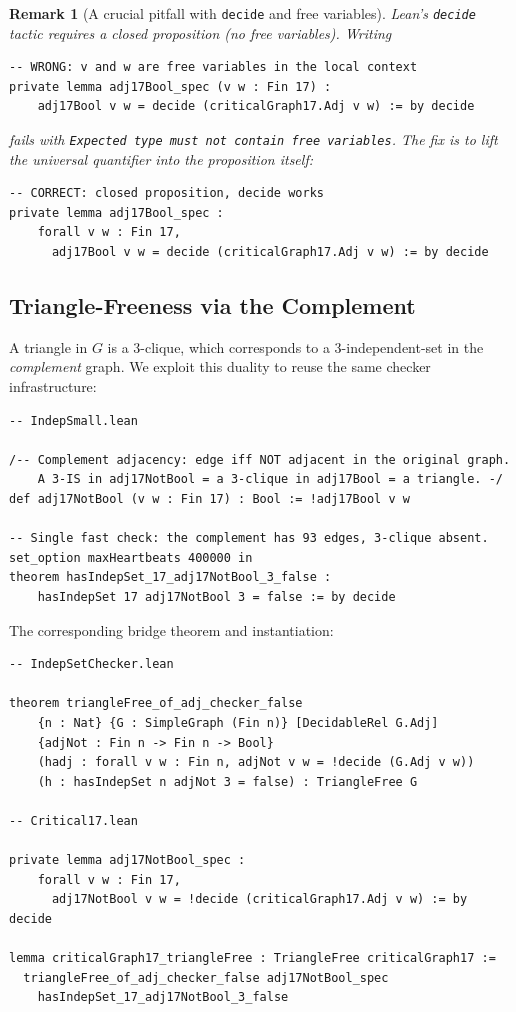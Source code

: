 \documentclass[11pt]{article}
\newtheorem{remark}[theorem]{Remark}
\newcommand{\lean}[1]{\texttt{#1}}
\begin{document}
\begin{remark}[A crucial pitfall with \lean{decide} and free variables]
\label{rem:freevar}
Lean's \lean{decide} tactic requires a \emph{closed} proposition (no free variables).
Writing

\begin{lstlisting}
-- WRONG: v and w are free variables in the local context
private lemma adj17Bool_spec (v w : Fin 17) :
    adj17Bool v w = decide (criticalGraph17.Adj v w) := by decide
\end{lstlisting}

\noindent
fails with \texttt{Expected type must not contain free variables}.
The fix is to lift the universal quantifier into the proposition itself:

\begin{lstlisting}
-- CORRECT: closed proposition, decide works
private lemma adj17Bool_spec :
    forall v w : Fin 17,
      adj17Bool v w = decide (criticalGraph17.Adj v w) := by decide
\end{lstlisting}
\end{remark}

\subsection{Triangle-Freeness via the Complement}
\label{sec:checker:tf}

A triangle in $G$ is a 3-clique, which corresponds to a 3-independent-set
in the \emph{complement} graph.
We exploit this duality to reuse the same checker infrastructure:

\begin{lstlisting}
-- IndepSmall.lean

/-- Complement adjacency: edge iff NOT adjacent in the original graph.
    A 3-IS in adj17NotBool = a 3-clique in adj17Bool = a triangle. -/
def adj17NotBool (v w : Fin 17) : Bool := !adj17Bool v w

-- Single fast check: the complement has 93 edges, 3-clique absent.
set_option maxHeartbeats 400000 in
theorem hasIndepSet_17_adj17NotBool_3_false :
    hasIndepSet 17 adj17NotBool 3 = false := by decide
\end{lstlisting}

\noindent
The corresponding bridge theorem and instantiation:

\begin{lstlisting}
-- IndepSetChecker.lean

theorem triangleFree_of_adj_checker_false
    {n : Nat} {G : SimpleGraph (Fin n)} [DecidableRel G.Adj]
    {adjNot : Fin n -> Fin n -> Bool}
    (hadj : forall v w : Fin n, adjNot v w = !decide (G.Adj v w))
    (h : hasIndepSet n adjNot 3 = false) : TriangleFree G

-- Critical17.lean

private lemma adj17NotBool_spec :
    forall v w : Fin 17,
      adj17NotBool v w = !decide (criticalGraph17.Adj v w) := by decide

lemma criticalGraph17_triangleFree : TriangleFree criticalGraph17 :=
  triangleFree_of_adj_checker_false adj17NotBool_spec
    hasIndepSet_17_adj17NotBool_3_false
\end{lstlisting}
\end{document}
